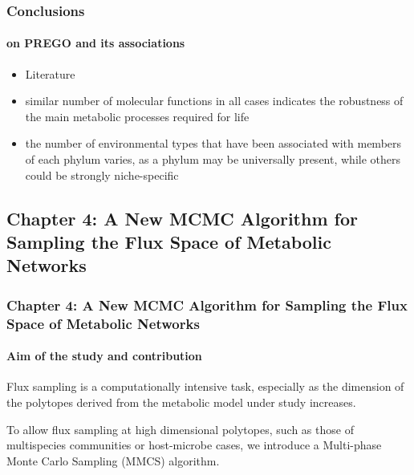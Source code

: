\documentclass{beamer}
\begin{document}
   \begin{frame}
      \frametitle{Conclusions}
      \framesubtitle{on PREGO and its associations}

      \small
      \begin{itemize}
         \item Literature 
         \item similar number of molecular functions in all cases indicates the robustness of the main
         metabolic processes required for life
         \item the number of environmental types that have been associated with members of each phylum varies, as a phylum may be universally present, while others could be
         strongly niche-specific
      \end{itemize}

   \end{frame}



   \begin{darkframes}
      \section{
         \textbf{Chapter 4}: A New MCMC Algorithm for Sampling the Flux Space of Metabolic Networks
      }   
   \end{darkframes}

    \begin{darkframes}
      \begin{frame}
         \frametitle{\textbf{Chapter 4}: A New MCMC Algorithm for Sampling
         the Flux Space of Metabolic Networks}
         \framesubtitle{Aim of the study and contribution}

         \small
         Flux sampling is a computationally intensive task, especially as the dimension of the 
         polytopes derived from the metabolic model under study increases. 



         \bigskip
         To allow flux sampling at high dimensional polytopes, 
         such as those of multispecies communities or host-microbe cases,
         we introduce a Multi-phase Monte Carlo Sampling (MMCS) algorithm. 


      \end{frame}
   \end{darkframes}
\end{document}
